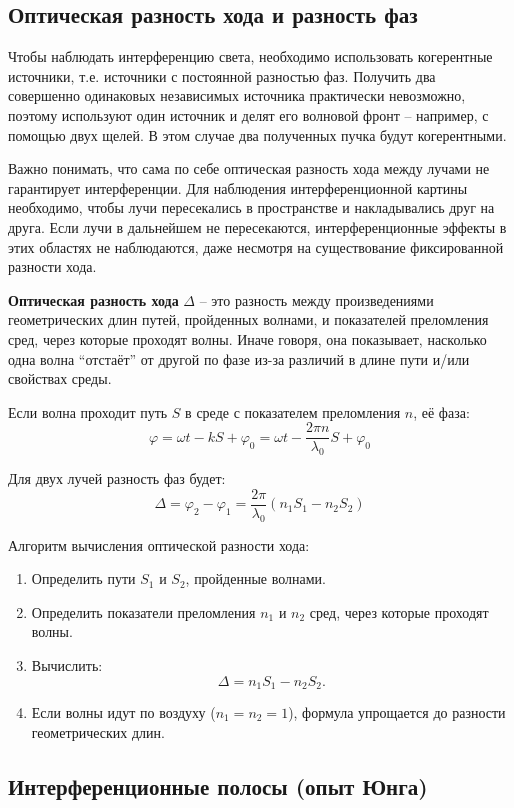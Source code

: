 \documentclass[12pt]{article}
\begin{document}
\subsection{Оптическая разность хода и разность фаз}

Чтобы наблюдать интерференцию света, необходимо использовать когерентные источники, т.е. источники с постоянной разностью фаз. Получить два совершенно одинаковых независимых источника практически невозможно, поэтому используют один источник и делят его волновой фронт -- например, с помощью двух щелей. В этом случае два полученных пучка будут когерентными.

Важно понимать, что сама по себе оптическая разность хода между лучами не гарантирует интерференции. Для наблюдения интерференционной картины необходимо, чтобы лучи пересекались в пространстве и накладывались друг на друга. Если лучи в дальнейшем не пересекаются, интерференционные эффекты в этих областях не наблюдаются, даже несмотря на существование фиксированной разности хода.

\textbf{Оптическая разность хода} $\Delta$ -- это разность между произведениями геометрических длин путей, пройденных волнами, и показателей преломления сред, через которые проходят волны. Иначе говоря, она показывает, насколько одна волна \enquote{отстаёт} от другой по фазе из-за различий в длине пути и/или свойствах среды.

Если волна проходит путь $S$ в среде с показателем преломления $n$, её фаза:
\[
\varphi = \omega t - k S + \varphi_0 = \omega t - \frac{2\pi n}{\lambda_0} S + \varphi_0
\]

Для двух лучей разность фаз будет:
\[
\Delta = \varphi_2 - \varphi_1 = \frac{2\pi}{\lambda_0}(n_1 S_1 - n_2 S_2)
\]

Алгоритм вычисления оптической разности хода:
\begin{enumerate}
  \item Определить пути $S_1$ и $S_2$, пройденные волнами.
  \item Определить показатели преломления $n_1$ и $n_2$ сред, через которые проходят волны.
  \item Вычислить: \[ \Delta = n_1 S_1 - n_2 S_2. \]
  \item Если волны идут по воздуху ($n_1 = n_2 = 1$), формула упрощается до разности геометрических длин.
\end{enumerate}


\subsection{Интерференционные полосы (опыт Юнга)}
\end{document}
